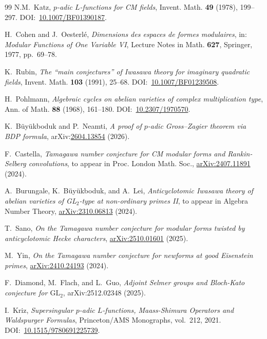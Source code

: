 \documentclass[12pt]{amsart}
\theoremstyle{definition}
\begin{document}
\begin{thebibliography}{99}
N.M.~Katz,
\emph{$p$-adic $L$-functions for CM fields},
Invent. Math. \textbf{49} (1978), 199--297.
DOI:~\href{https://doi.org/10.1007/BF01390187}{10.1007/BF01390187}.

H.~Cohen and J.~Oesterlé,
\emph{Dimensions des espaces de formes modulaires},
in: \emph{Modular Functions of One Variable VI},
Lecture Notes in Math. \textbf{627}, Springer, 1977, pp.~69--78.

K.~Rubin,
\emph{The ``main conjectures'' of Iwasawa theory for imaginary quadratic fields},
Invent. Math. \textbf{103} (1991), 25--68.
DOI:~\href{https://doi.org/10.1007/BF01239508}{10.1007/BF01239508}.

H.~Pohlmann,
\emph{Algebraic cycles on abelian varieties of complex multiplication type},
Ann. of Math. \textbf{88} (1968), 161--180.
DOI:~\href{https://doi.org/10.2307/1970570}{10.2307/1970570}.

K.~Büyükboduk and P.~Neamti,
\emph{A proof of $p$-adic Gross--Zagier theorem via BDP formula},
arXiv:\href{https://arxiv.org/abs/2604.13854}{2604.13854} (2026).

F.~Castella,
\emph{Tamagawa number conjecture for {CM} modular forms and {Rankin-Selberg} convolutions},
to appear in Proc. London Math. Soc., \href{https://arxiv.org/abs/2407.11891}{arXiv:2407.11891} (2024).

A.~Burungale, K.~Büyükboduk, and A.~Lei,
\emph{Anticyclotomic {Iwasawa} theory of abelian varieties of {GL}$_2$-type at non-ordinary primes {II}},
to appear in Algebra Number Theory, \href{https://arxiv.org/abs/2310.06813}{arXiv:2310.06813} (2024).

T.~Sano,
\emph{On the {Tamagawa} number conjecture for modular forms twisted by anticyclotomic {Hecke} characters},
\href{https://arxiv.org/abs/2510.01601}{arXiv:2510.01601} (2025).

M.~Yin,
\emph{On the {Tamagawa} number conjecture for newforms at good {Eisenstein} primes},
\href{https://arxiv.org/abs/2410.24193}{arXiv:2410.24193} (2024).

F.~Diamond, M.~Flach, and L.~Guo,
\emph{Adjoint Selmer groups and Bloch-Kato conjecture for $\mathrm{GL}_2$},
arXiv:2512.02348 (2025).

I.~Kriz,
\emph{Supersingular $p$-adic $L$-functions, Maass-Shimura Operators
and Waldspurger Formulas},
Princeton/AMS Monographs, vol.~212, 2021.
DOI:~\href{https://doi.org/10.1515/9780691225739}{10.1515/9780691225739}.


\end{thebibliography}
\end{document}
